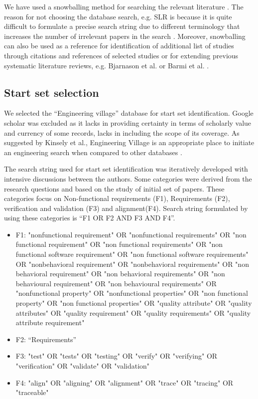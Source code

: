 \documentclass{article}
\begin{document}
We have used a snowballing method for searching the relevant literature \cite{wohlin2014guidelines}. The reason for not choosing the database search, e.g. SLR is because it is quite difficult to formulate a precise search string due to different terminology that increases the number of irrelevant papers in the search \cite{wohlin2014guidelines,kitchenham2009systematic,kitchenham2010systematic}. Moreover, snowballing can also be used as a reference for identification of additional list of studies through citations and references of selected studies \cite{wohlin2014guidelines} or for extending previous systematic literature reviews, e.g. Bjarnason et al. \cite{bjarnason2013distances} or Barmi et al. \cite{barmi2011alignmentS1}.

\subsection{Start set selection }
We selected the “Engineering village” database for start set identification. Google scholar was excluded as it lacks in providing certainty in terms of scholarly value and currency of some records, lacks in including the scope of its coverage. As suggested by Kinsely et al.,  Engineering Village is an appropriate place to initiate an engineering search when compared to other databases \cite{knisely2014engineering}. 

The search string used for start set identification was iteratively developed with intensive discussions between the authors. Some categories were derived from the research questions and based on the study of initial set of papers.  These categories focus on Non-functional requirements (F1), Requirements (F2), verification and validation (F3) and alignment(F4). Search string formulated by using these categories is “F1 OR F2 AND F3 AND F4”. 
\begin{itemize}
    \item  F1: "nonfunctional requirement" OR "nonfunctional requirements" OR "non functional requirement" OR "non functional requirements" OR "non functional software requirement" OR "non functional software requirements" OR "nonbehavioral requirement" OR "nonbehavioral requirements" OR "non behavioral requirement" OR "non behavioral requirements" OR "non behavioural requirement" OR "non behavioural requirements" OR "nonfunctional property" OR "nonfunctional properties" OR "non functional property" OR "non functional properties" OR "quality attribute" OR "quality attributes" OR "quality requirement" OR "quality requirements" OR "quality attribute requirement"
    \item F2: “Requirements” 
    \item F3: "test" OR "tests" OR "testing" OR "verify" OR "verifying" OR "verification" OR "validate" OR "validation"
    \item F4: "align" OR "aligning" OR "alignment" OR "trace" OR "tracing" OR "traceable" 
\end{itemize}
\end{document}

